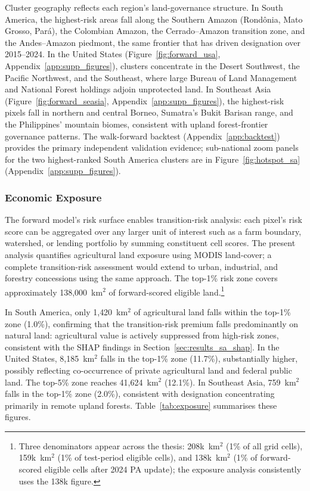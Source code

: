 \documentclass[12pt]{article}
\theoremstyle{break}
\begin{document}
Cluster geography reflects each region's land-governance structure.
In South America, the highest-risk areas fall along the Southern Amazon
(Rondônia, Mato Grosso, Pará), the Colombian Amazon, the Cerrado--Amazon transition
zone, and the Andes--Amazon piedmont, the same frontier that has driven designation
over 2015--2024.
In the United States (Figure~\ref{fig:forward_usa}, Appendix~\ref{app:supp_figures}),
clusters concentrate in the Desert Southwest, the Pacific Northwest, and the Southeast, 
where large Bureau of Land Management and National Forest holdings adjoin unprotected land.
In Southeast Asia (Figure~\ref{fig:forward_seasia}, Appendix~\ref{app:supp_figures}),
the highest-risk pixels fall in northern and central Borneo, Sumatra's Bukit Barisan range,
and the Philippines' mountain biomes, consistent with upland forest-frontier governance patterns.
The walk-forward backtest (Appendix~\ref{app:backtest}) provides the primary independent
validation evidence; sub-national zoom panels for the two highest-ranked South America
clusters are in Figure~\ref{fig:hotspot_sa} (Appendix~\ref{app:supp_figures}).

\subsubsection{Economic Exposure}
\label{sec:results_exposure}
The forward model's risk surface enables transition-risk analysis: each pixel's risk
score can be aggregated over any larger unit of interest such as a farm boundary, watershed,
or lending portfolio by summing constituent cell scores. The present analysis
quantifies agricultural land exposure using MODIS land-cover; a complete
transition-risk assessment would extend to urban, industrial, and forestry concessions
using the same approach. The top-1\% risk zone covers approximately 138,000~km$^2$
of forward-scored eligible land.\footnote{Three denominators appear across the thesis:
208k~km$^2$ (1\% of all grid cells), 159k~km$^2$ (1\% of test-period eligible cells),
and 138k~km$^2$ (1\% of forward-scored eligible cells after 2024 PA update);
the exposure analysis consistently uses the 138k figure.}

In South America, only 1{,}420~km$^2$ of agricultural land falls within the top-1\%
zone (1.0\%), confirming that the transition-risk premium falls predominantly on
natural land: agricultural value is actively suppressed from high-risk zones,
consistent with the SHAP findings in Section~\ref{sec:results_sa_shap}. In the
United States, 8{,}185~km$^2$ falls in the top-1\% zone (11.7\%), substantially
higher, possibly reflecting co-occurrence of private agricultural land and
federal public land. The top-5\% zone reaches
41{,}624~km$^2$ (12.1\%). In Southeast Asia, 759~km$^2$ falls in the top-1\% zone
(2.0\%), consistent with designation concentrating primarily in remote upland forests.
Table~\ref{tab:exposure} summarises these figures.
\end{document}
